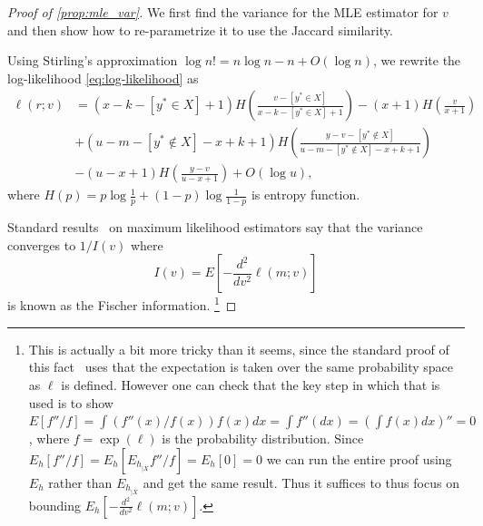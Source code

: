 \begin{proof}[Proof of \cref{prop:mle_var}]
   We first find the variance for the MLE estimator for $v$ and then show how to re-parametrize it to use the Jaccard similarity.

   Using Stirling's approximation $ \log n! = n\log n - n + O(\log n)$,
   we rewrite the log-likelihood \cref{eq:log-likelihood} as
   \begin{align}
      \ell(r;v) &=
      (x-k-[y^*\in X]+1)H(\tfrac{v-[y^*\in X]}{x-k-[y^*\in X]+1})
               - (x+1) H(\tfrac{v}{x+1})
              \\&+(u-m-[y^*\not\in X]-x+k+1) H(\tfrac{y-v-[y^*\not\in X]}{u-m-[y^*\not\in X]-x+k+1})
              \\& -(u-x+1) H(\tfrac{y-v}{u-x+1})
   + O(\log u),
   \end{align}
   where $H(p)=p \log \frac{1}{p} + (1-p)\log \frac{1}{1-p}$ is entropy function.

   Standard results~\cite{panchenko2016lec3} on maximum likelihood estimators say that
   the variance converges to $1/I(v)$ where
   \[
      I(v) = E\left[-\frac{d^2}{dv^2}\ell(m;v)\right]
   \]
   is known as the Fischer information.
   \footnote{This is actually a bit more tricky than it seems, since
      the standard proof of this fact~\cite{panchenko2016lec3} uses that the expectation is taken over the same probability space as $\ell$ is defined.
      However one can check that the key step in which that is used is to show
      $E[f''/f] = \int (f''(x)/f(x))f(x)dx = \int f''(dx) = (\int f(x)dx)'' = 0$, where $f=\exp(\ell)$ is the probability distribution.
      Since $E_h[f''/f] = E_h[E_{h_{|\overline X}}f''/f] = E_h[0]= 0$
      we can run the entire proof using $E_h$ rather than $E_{h_{|\overline X}}$ and get the same result.
      Thus it suffices to thus focus on bounding $E_h[-\frac{d^2}{dv^2}\ell(m;v)]$.
   }



\end{proof}
